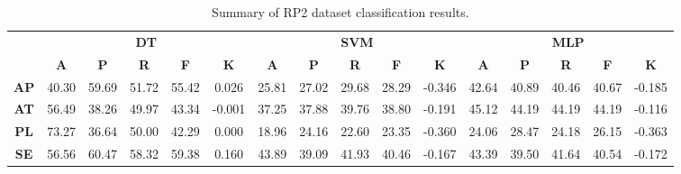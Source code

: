 \begin{landscape}
\begin{table}[htbp]
\footnotesize
\centering
\caption{Summary of RP2 dataset classification results.}
\label{tab:base_female}
\begin{tabular}{|c|c|c|c|c|c|c|c|c|c|c|c|c|c|c|c|}
\hline
\multirow{2}{*}{}	& \multicolumn{5}{c|}{\textbf{DT}}												& \multicolumn{5}{c|}{\textbf{SVM}}												& \multicolumn{5}{c|}{\textbf{MLP}}												\\ \cline{2-16} 
					& \textbf{A}	& \textbf{P}	& \textbf{R}	& \textbf{F}	& \textbf{K}	& \textbf{A}	& \textbf{P}	& \textbf{R}	& \textbf{F}	& \textbf{K}	& \textbf{A}	& \textbf{P}	& \textbf{R}	& \textbf{F}	& \textbf{K}	\\ \hline
\textbf{AP}			& 40.30			& 59.69			& 51.72			& 55.42			& 0.026			& 25.81			& 27.02			& 29.68			& 28.29			& -0.346			& 42.64			& 40.89			& 40.46			& 40.67			& -0.185			\\ \hline
\textbf{AT}			& 56.49			& 38.26			& 49.97			& 43.34			& -0.001			& 37.25			& 37.88			& 39.76			& 38.80			& -0.191			& 45.12			& 44.19			& 44.19			& 44.19			& -0.116			\\ \hline
\textbf{PL}			& 73.27			& 36.64			& 50.00			& 42.29			& 0.000			& 18.96			& 24.16			& 22.60			& 23.35			& -0.360			& 24.06			& 28.47			& 24.18			& 26.15			& -0.363			\\ \hline
\textbf{SE}			& 56.56			& 60.47			& 58.32			& 59.38			& 0.160			& 43.89			& 39.09			& 41.93			& 40.46			& -0.167			& 43.39			& 39.50			& 41.64			& 40.54			& -0.172			\\ \hline
\end{tabular}
\end{table}
\end{landscape}